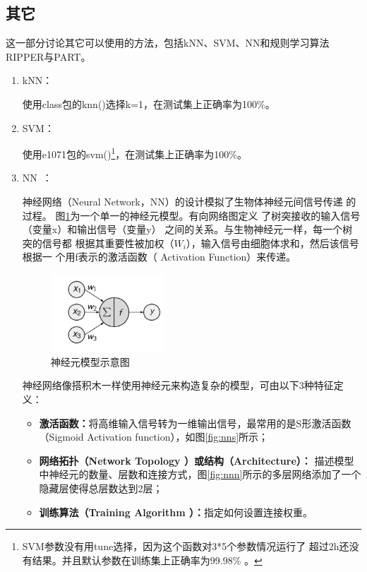 \documentclass[lang=cn,11pt,a4paper,cite=super]{elegantpaper}
\begin{document}
\subsection{其它}
这一部分讨论其它可以使用的方法，包括kNN、SVM、NN和规则学习算法RIPPER与PART。
\begin{enumerate}
   \item kNN：\par 使用class包的knn()选择k=1，在测试集上正确率为100\%。
   \item SVM：\par 使用e1071包的svm()\footnote{SVM参数没有用tune选择，因为这个函数对3*5个参数情况运行了
   超过2h还没有结果。并且默认参数在训练集上正确率为99.98\% 。}，在测试集上正确率为100\%。
   \item NN~\cite{mlwr}：\par 神经网络（Neural Network，NN）的设计模拟了生物体神经元间信号传递
   的过程。  
   图\ref{fig:nn1}为一个单一的神经元模型。有向网络图定义
了树突接收的输入信号（变量x）和输出信号（变量y）
之间的关系。与生物神经元一样，每一个树突的信号都
根据其重要性被加权（$W_i$），输入信号由细胞体求和，然后该信号根据一
个用f表示的激活函数（ Activation Function）来传递。
\begin{figure}[htb]
   \centering
   \includegraphics[width=0.4\textwidth]{img/nn1.PNG}
   \caption{神经元模型示意图}
   \label{fig:nn1}
\end{figure}
   神经网络像搭积木一样使用神经元来构造复杂的模型，可由以下3种特征定义：
   \begin{itemize}
      \item \textbf{ 激活函数：}将高维输入信号转为一维输出信号，最常用的是S形激活函数（Sigmoid Activation function），如图\ref{fig:nns}所示；
      \item \textbf{网络拓扑（Network Topology ）或结构（Architecture）：}
      描述模型中神经元的数量、层数和连接方式，图\ref{fig:nnn}所示的多层网络添加了一个隐藏层使得总层数达到2层；
      \item \textbf{训练算法（Training Algorithm ）：}指定如何设置连接权重。
   \end{itemize}
   \begin{figure}[htb]

\end{figure}
\end{enumerate}
\end{document}
